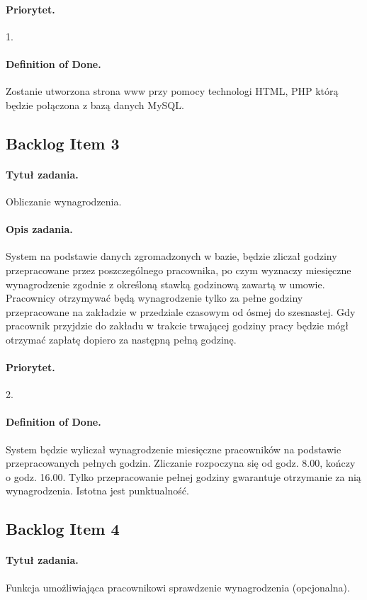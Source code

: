 \documentclass[a4paper]{article}
\begin{document}
\paragraph{Priorytet.} 1.
\paragraph{Definition of Done.} Zostanie utworzona strona www przy pomocy technologi HTML, PHP którą będzie połączona z bazą danych MySQL.

\subsection{Backlog Item 3}
\paragraph{Tytuł zadania.} Obliczanie wynagrodzenia.
\paragraph{Opis zadania.} System na podstawie danych zgromadzonych w bazie, będzie zliczał godziny przepracowane przez poszczególnego pracownika, po czym wyznaczy miesięczne wynagrodzenie zgodnie z określoną stawką godzinową zawartą w umowie. Pracownicy otrzymywać będą wynagrodzenie tylko za pełne godziny przepracowane na zakładzie w przedziale czasowym od ósmej do szesnastej. Gdy pracownik przyjdzie do zakładu w trakcie trwającej godziny pracy będzie mógł otrzymać zapłatę dopiero za następną pełną godzinę.
\paragraph{Priorytet.} 2.
\paragraph{Definition of Done.} System będzie wyliczał wynagrodzenie miesięczne pracowników na podstawie przepracowanych pełnych godzin. Zliczanie rozpoczyna się od godz. 8.00, kończy o godz. 16.00. Tylko przepracowanie pełnej godziny gwarantuje otrzymanie za nią wynagrodzenia. Istotna jest punktualność.

\subsection{Backlog Item 4}
\paragraph{Tytuł zadania.} Funkcja umożliwiająca pracownikowi sprawdzenie wynagrodzenia (opcjonalna).
\end{document}
